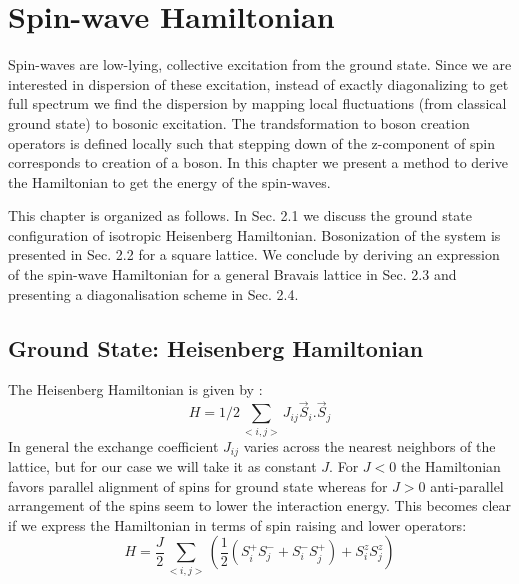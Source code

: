 \chapter{\label{method}Spin-wave Hamiltonian}
Spin-waves are low-lying, collective excitation from the ground state. Since we are interested in dispersion of these excitation, instead of exactly diagonalizing to get full spectrum we find the dispersion by mapping local fluctuations (from classical ground state) to bosonic excitation. The trandsformation to boson creation operators is defined locally such that stepping down of the z-component of spin corresponds to creation of a boson. In this chapter we present a method to derive the Hamiltonian to get the energy of the spin-waves.

This chapter is organized as follows. In Sec. 2.1 we discuss the ground state configuration of isotropic Heisenberg Hamiltonian. Bosonization of the system is presented in Sec. 2.2 for a square lattice. We conclude by deriving an expression of the spin-wave Hamiltonian for a general Bravais lattice in Sec. 2.3 and presenting a diagonalisation scheme in Sec. 2.4.
\section{Ground State: Heisenberg Hamiltonian}

The Heisenberg Hamiltonian is given by :
\begin{equation}
H = 1/2\sum_{<i,j>}{ }J_{ij}\vec{S}_i.\vec{S}_j
\end{equation}
In general the exchange coefficient $ J_{ij} $ varies across the nearest neighbors of the lattice, but for our case we will take it as constant $ J $.  For $ J < 0 $ the Hamiltonian favors parallel alignment of spins for ground state whereas for $ J > 0 $ anti-parallel arrangement of the spins seem to lower the interaction energy. This becomes clear if we express the Hamiltonian in terms of spin raising and lower operators:
\begin{equation}
H = \frac{J}{2}\sum_{<i,j>}^{}(\frac{1}{2}(S^+_iS^-_j + S^-_iS^+_j) + S^z_iS^z_j)
\end{equation}

